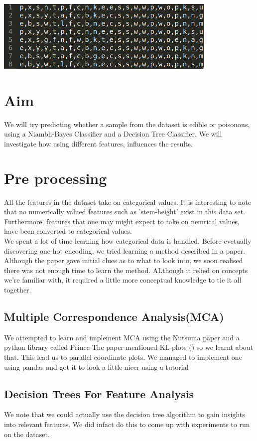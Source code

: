 \documentclass[12pt]{book}
\begin{document}
\includegraphics[scale = 0.75]{Rawdata.png}\\[1.0 cm]

\section{Aim}
We will try predicting whether a sample from the dataset is edible or poisonous,
using a Niambh-Bayes Classifier and a Decision Tree Classifier.
We will investigate how using different features, influences
the results.

\section{Pre processing}
All the features in the dataset take on categorical values.
It is interesting to note that no numerically valued features such as 'stem-height'
exist in this data set.\\
Furthermore, features that one may might expect to
take on nemrical values, have been converted to categorical values.\\
We spent a lot of time learning how categorical data is handled.
Before evetually discovering one-hot encoding, we tried learning a method
described in a paper.\cite{RS}
Although the paper gave initial clues as to what to look into,
we soon realised there was not enough time to learn the method. ALthough it relied on concepts we're familiar with,
it required a little more conceptual knowledge to tie it all together.

\subsection{Multiple Correspondence Analysis(MCA)}
We attempted to learn and implement MCA using the Niitsuma paper and a python library called Prince \cite{Prince}
The paper mentioned KL-plots () so we learnt about that.
This lead us to parallel coordinate plots.
We managed to implement one using pandas and got it to look a little nicer using a tutorial\cite{niceParallel}

\subsection{Decision Trees For Feature Analysis}
We note that we could actually use the decision tree algorithm to gain insights into relevant features.
We did infact do this to come up with experiments to run on the dataset.
\end{document}
